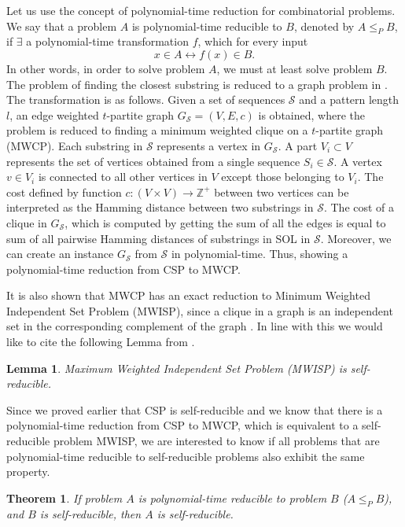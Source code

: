 \documentclass[journal]{acm_proc_article-sp}
\newtheorem{theorem}{Theorem}
\newtheorem{lemma}{Lemma}
\begin{document}
Let us use the concept of polynomial-time reduction for combinatorial problems. We say that a problem $A$ is polynomial-time reducible to $B$, denoted by $A \leq_P B$, if $\exists $ a polynomial-time transformation $f$, which for every input 
$$x \in A \leftrightarrow f(x) \in B.$$
In other words, in order to solve problem $A$, we must at least solve problem $B$. The problem of finding the closest substring is reduced to a graph problem in \cite{Pevzner2000}. The transformation is as follows. Given a set of sequences $\mathcal{S}$ and a pattern length $l$, an edge weighted  $t$-partite graph $G_\mathcal{S} = (V, E, c)$ is obtained, where the problem is reduced to finding  a minimum weighted clique on a $t$-partite graph (MWCP). Each substring in $\mathcal{S}$ represents a vertex in $G_\mathcal{S}$. A part $V_i \subset V$ represents the set of vertices obtained from a single sequence $S_i \in \mathcal{S}$. A vertex $v \in V_i$ is connected to all other vertices in $V$ except those belonging to $V_i$. The cost defined by function $c:(V \times V) \rightarrow \mathbb{Z}^+$ between two vertices can be interpreted as the Hamming distance between two substrings in $\mathcal{S}$. The cost of a clique in $G_\mathcal{S}$, which is computed by getting the sum of all the edges is equal to sum of all pairwise Hamming distances of substrings in SOL in $\mathcal{S}$. Moreover, we can create an instance $G_\mathcal{S}$ from $\mathcal{S}$ in polynomial-time. Thus, showing a polynomial-time reduction from CSP to MWCP. 

It is also shown that MWCP has an exact reduction to  Minimum Weighted Independent Set Problem (MWISP), since a clique in a graph is an independent set in the corresponding complement of the graph \cite{Garey1979}. In line with this we would like to cite the following Lemma from \cite{Zych2012}. 

\begin{lemma}
Maximum Weighted Independent Set Problem (MWISP) is \textit{self-reducible}.
\end{lemma}

Since we proved earlier that CSP is self-reducible and we know that there is a polynomial-time reduction from CSP to MWCP, which is equivalent to a self-reducible problem MWISP, we are interested to know if all problems that are polynomial-time reducible to self-reducible problems also exhibit the same property.


\begin{theorem} \label{thm:gen_selfreduc}
If problem $A$ is polynomial-time reducible to problem $B$ ($A \leq_{P} B$), and $B$ is self-reducible, then  $A$ is self-reducible. 
\end{theorem}
\end{document}
